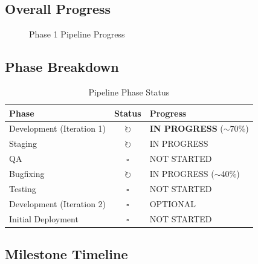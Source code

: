 \documentclass[12pt,a4paper]{article}
\begin{document}
\subsection{Overall Progress}

\begin{figure}[H]
\centering
{}
\caption{Phase 1 Pipeline Progress}
\end{figure}

\subsection{Phase Breakdown}

\begin{table}[H]
\centering
\begin{tabularx}{\textwidth}{|l|c|X|}
\hline
\textbf{Phase} & \textbf{Status} & \textbf{Progress} \\
\hline
Development (Iteration 1) & \textcolor{accent}{$\circlearrowright$} & \textbf{IN PROGRESS} ($\sim$70\%) \\
\hline
Staging & \textcolor{accent}{$\circlearrowright$} & IN PROGRESS \\
\hline
QA & $\square$ & NOT STARTED \\
\hline
Bugfixing & \textcolor{accent}{$\circlearrowright$} & IN PROGRESS ($\sim$40\%) \\
\hline
Testing & $\square$ & NOT STARTED \\
\hline
Development (Iteration 2) & $\square$ & OPTIONAL \\
\hline
Initial Deployment & $\square$ & NOT STARTED \\
\hline
\end{tabularx}
\caption{Pipeline Phase Status}
\end{table}

\subsection{Milestone Timeline}
\end{document}
